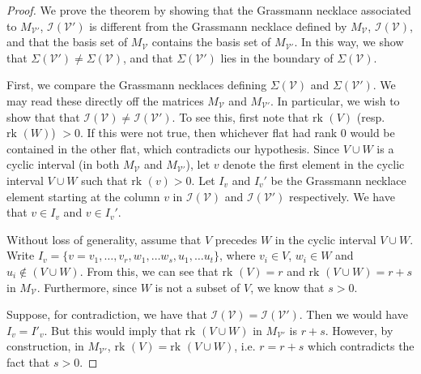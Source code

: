 \documentclass[11pt]{article}
\newcommand{\rk}{\textrm{rk }}
\newcommand{\cV}{\mathcal{V}}
\newcommand{\cI}{\mathcal{I}}
\newcommand{\cB}{\mathcal{B}}
\theoremstyle{remark}
\theoremstyle{definition}
\begin{document}
\begin{proof} 
We prove the theorem by showing that the Grassmann necklace associated to $M_{\cV'}$, $\cI(\cV')$ is different from the Grassmann necklace defined by $M_{\cV}$, $\cI(\cV)$, and that the basis set of $M_{\cV}$ contains the basis set of $M_{\cV'}$. In this way, we show that $\Sigma(\cV') \neq \Sigma(\cV)$, and that  $\Sigma(\cV')$ lies in the boundary of $\Sigma(\cV)$. 

First, we compare the Grassmann necklaces defining $\Sigma(\cV)$ and $\Sigma(\cV')$. We may read these directly off the matrices $M_{\cV}$ and $M_{\cV'}$. In particular, we wish to show that that $\cI(\cV) \neq \cI(\cV')$. To see this, first note that $\rk(V)$ (resp. $\rk(W)$) $>0$. If this were not true, then whichever flat had rank $0$ would be contained in the other flat, which contradicts our hypothesis. Since $V \cup W$ is a cyclic interval (in both $M_\cV$ and $M_{\cV'}$), let $v$ denote the first element in the cyclic interval $V\cup W$ such that $\rk(v) >0$. Let $I_v$ and $I_v'$ be the Grassmann necklace element starting at the column $v$ in $\cI(\cV)$ and $\cI(\cV')$ respectively. We have that $v \in I_v$ and $v \in I_v'$. 

Without loss of generality, assume that $V$ precedes $W$ in the cyclic interval $V \cup W$. Write $I_v = \{v = v_1, \ldots, v_r, w_1, \ldots w_s, u_1, \ldots u_t\}$, where $v_i \in V$, $w_i \in W$ and $u_i \not \in (V \cup W)$. From this, we can see that $\rk(V) = r$ and $\rk(V\cup W) = r+s$ in $M_\cV$. Furthermore, since $W$ is not a subset of $V$, we know that $s > 0$. 

Suppose, for contradiction, we have that $\cI(\cV) = \cI(\cV')$. Then we would have $I_v = I'_v$. But this would imply that $\rk(V \cup W)$ in $M_{\cV'}$ is $r+ s$. However, by construction, in $M_{\cV'}$, $\rk(V) = \rk(V\cup W)$, i.e. $r = r+s$ which contradicts the fact that $s > 0$. 

\begin{comment}
 inote that some vertex of $V$ (resp. $W$)  appears at least once in $\cI(C)$. To see this, note that any element that does not ever appear in $\cI(C)$ has rank $0$. Since neither $V$ nor $W$ has rank $0$, they must each contain at least one element that appears in $\cI(C)$. Therefore, we know that there exists some $I_j \in \cI(C)$ such that $I_j \cap W \neq \emptyset$. Fix such a $j$ and let $a \in  I_j \cap W$ be an element of $W$ that is in said $I_j$. Let $I'_j$ be the corresponding element of $\cI(C')$. We claim that $I_j \neq I_j'$. That is, the $j^{th}$ minor in $\cI(C')$ is not the same as the $j^{th}$ minor of $\cI(C)$. This shows that $M(C)$ and $M(C')$ define two different positroid cells. Then it remains to show that the the basis set $\cB$ of $M(C)$ contains the basis set $\cB'$ of $M(C')$. 


\end{comment}
\end{proof}
\end{document}
